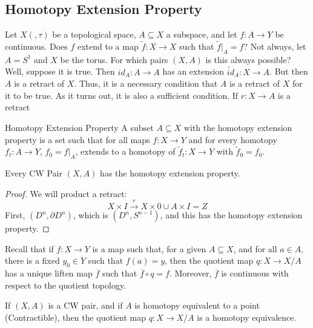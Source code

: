 \documentclass{book}                                                           %
\begin{document}
    \subsection{Homotopy Extension Property}
        Let $X(,\tau)$ be a topological space,
        $A\subseteq{X}$ a subspace, and let
        $f:A\rightarrow{Y}$ be continuous. Does
        $f$ extend to a map $\tilde{f}:X\rightarrow{X}$
        such that $\tilde{f}|_{A}=f$? Not always, let
        $A=S^{1}$ and $X$ be the torus. For which pairs
        $(X,A)$ is this always possible? Well, suppose
        it is true. Then $id_{A}:A\rightarrow{A}$ has
        an extension $\tilde{id}_{A}:X\rightarrow{A}$.
        But then $A$ is a retract of $X$. Thus, it
        is a necessary condition that $A$ is a retract
        of $X$ for it to be true. As it turns out, it is
        also a sufficient condition. If
        $r:X\rightarrow{A}$ is a retract
        \begin{ldefinition}{Homotopy Extension Property}
            A subset $A\subseteq{X}$ with the homotopy
            extension property is a set such that for all
            maps $f:X\rightarrow{Y}$ and for every
            homotopy $f_{t}:A\rightarrow{Y}$,
            $f_{0}=f|_{A}$, extends to a homotopy of
            $\tilde{f}_{t}:X\rightarrow{Y}$ with
            $\tilde{f}_{0}=f_{0}$.
        \end{ldefinition}
        \begin{theorem}
            Every CW Pair $(X,A)$ has the homotopy
            extension property.
        \end{theorem}
        \begin{proof}
            We will product a retract:
            \begin{equation}
                X\times{I}\overset{r}{\longrightarrow}
                    X\times{0}\cup{A}\times{I}=Z
            \end{equation}
            First, $(D^{n},\partial{D}^{n})$, which is
            $(D^{n},S^{n-1})$, and this has the
            homotopy extension property.
        \end{proof}
        Recall that if $f:X\rightarrow{Y}$ is a map such that,
        for a given $A\subseteq{X}$, and for all $a\in{A}$,
        there is a fixed $y_{0}\in{Y}$ such that $f(a)=y$, then
        the quotient map $q:X\rightarrow{X/A}$ has a unique
        liften map $\overline{f}$ such that
        $\overline{f}\circ{q}=f$. Moreover, $\overline{f}$ is
        continuous with respect to the quotient topology.
        \begin{theorem}
            If $(X,A)$ is a CW pair, and if $A$ is
            homotopy equivalent to a point
            (Contractible), then the quotient map
            $q:X\rightarrow{X/A}$ is a homotopy
            equivalence.
        \end{theorem}
\end{document}
